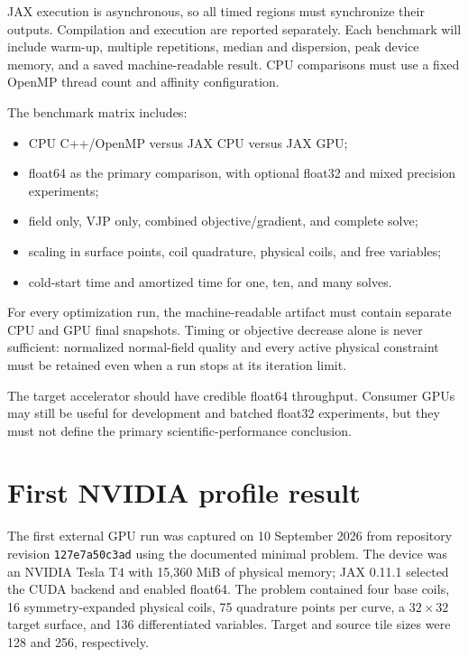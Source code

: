 \documentclass[11pt,a4paper]{article}
\newcommand{\code}[1]{\texttt{#1}}
\begin{document}
JAX execution is asynchronous, so all timed regions must synchronize their
outputs.  Compilation and execution are reported separately.  Each benchmark
will include warm-up, multiple repetitions, median and dispersion, peak device
memory, and a saved machine-readable result.  CPU comparisons must use a fixed
OpenMP thread count and affinity configuration.

The benchmark matrix includes:
\begin{itemize}
  \item CPU C++/OpenMP versus JAX CPU versus JAX GPU;
  \item float64 as the primary comparison, with optional float32 and mixed
        precision experiments;
  \item field only, VJP only, combined objective/gradient, and complete solve;
  \item scaling in surface points, coil quadrature, physical coils, and free
        variables;
  \item cold-start time and amortized time for one, ten, and many solves.
\end{itemize}

For every optimization run, the machine-readable artifact must contain separate
CPU and GPU final snapshots.  Timing or objective decrease alone is never
sufficient: normalized normal-field quality and every active physical
constraint must be retained even when a run stops at its iteration limit.

The target accelerator should have credible float64 throughput.  Consumer GPUs
may still be useful for development and batched float32 experiments, but they
must not define the primary scientific-performance conclusion.

\section{First NVIDIA profile result}\label{sec:first-profile}
\begingroup\footnotesize

The first external GPU run was captured on 10 September 2026 from repository
revision \code{127e7a50c3ad} using the documented minimal problem.  The device
was an NVIDIA Tesla T4 with 15,360 MiB of physical memory; JAX 0.11.1 selected
the CUDA backend and enabled float64.  The problem contained four base coils,
16 symmetry-expanded physical coils, 75 quadrature points per curve, a
$32\times32$ target surface, and 136 differentiated variables.  Target and
source tile sizes were 128 and 256, respectively.
\end{document}
